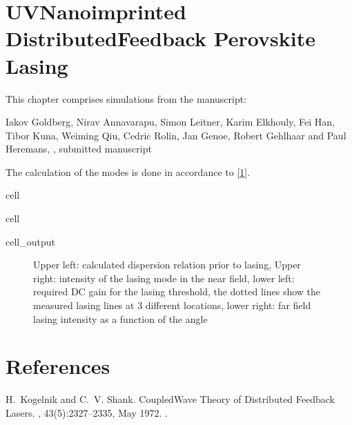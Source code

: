 \documentclass[a4paper,10pt,english,openany,oneside]{jupyterBook}
\begin{document}
\chapter{UV\sphinxhyphen{}Nanoimprinted Distributed\sphinxhyphen{}Feedback Perovskite Lasing}
\label{\detokenize{NanoimprintedDFB:uv-nanoimprinted-distributed-feedback-perovskite-lasing}}\label{\detokenize{NanoimprintedDFB::doc}}
\sphinxAtStartPar
This chapter comprises simulations from the manuscript:

\sphinxAtStartPar
Iakov Goldberg, Nirav Annavarapu, Simon Leitner, Karim Elkhouly, Fei Han, Tibor Kuna, Weiming Qiu, Cedric Rolin, Jan Genoe, Robert Gehlhaar and Paul Heremans, , submitted manuscript

\sphinxAtStartPar
The calculation of the modes is done in accordance to {[}\hyperlink{cite.bib:id3}{1}{]}.

\begin{sphinxuseclass}{cell}
\end{sphinxuseclass}
\begin{sphinxuseclass}{cell}\begin{sphinxVerbatimOutput}

\begin{sphinxuseclass}{cell_output}
\begin{figure}[htbp]
\centering
\capstart

\noindent{}
\caption{Upper left: calculated dispersion relation prior to lasing, Upper right: intensity of the lasing mode in the near field, lower left: required DC gain for the lasing threshold, the dotted lines show the measured lasing lines at 3 different locations, lower right: far field lasing intensity as a function of the angle}\label{\detokenize{NanoimprintedDFB:iakov1}}\end{figure}

\end{sphinxuseclass}\end{sphinxVerbatimOutput}

\end{sphinxuseclass}
\sphinxstepscope


\chapter{References}
\label{\detokenize{bib:references}}\label{\detokenize{bib::doc}}
\begin{sphinxthebibliography}{1}
\sphinxAtStartPar
H. Kogelnik and C. V. Shank. Coupled\sphinxhyphen{}Wave Theory of Distributed Feedback Lasers. , 43(5):2327–2335, May 1972. .
\end{sphinxthebibliography}







\renewcommand{\indexname}{Index}
\printindex
\end{document}
